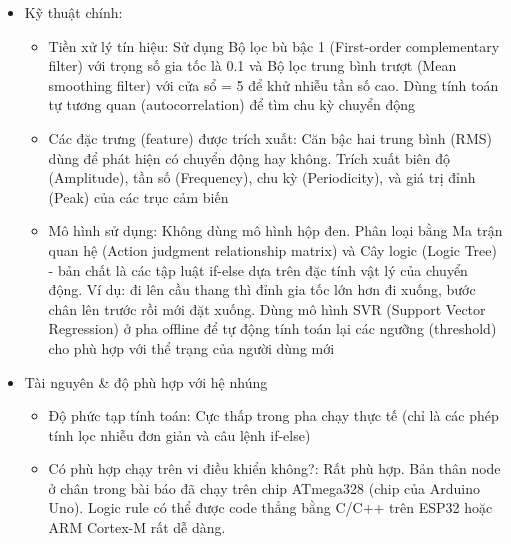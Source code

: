 \documentclass[../DoAn.tex]{subfiles}
\begin{document}
\begin{enumerate}[label=\arabic*)]
\begin{itemize}
        \begin{itemize}
            \item Thuộc loại: Hybrid (Threshold-based / Suy luận logic kết hợp với Machine Learning nhẹ để tinh chỉnh)
            \item Pipeline xử lý tổng quát: Thu thập dữ liệu đa nguồn $\Longrightarrow$ Tiền xử lý (Lọc nhiễu, tính RMS để phát hiện điểm bắt đầu) $\Longrightarrow$ Rút trích đặc trưng cơ bản $\Longrightarrow$ Phân loại bằng Cây logic (Logic Tree/Ontology reasoning) $\Longrightarrow$ Hiệu chỉnh ngưỡng thích ứng bằng hàm SVR (Cá nhân hóa)
        \end{itemize}
        \item Kỹ thuật chính:
        \begin{itemize}
            \item Tiền xử lý tín hiệu: Sử dụng Bộ lọc bù bậc 1 (First-order complementary filter) với trọng số gia tốc là 0.1 và Bộ lọc trung bình trượt (Mean smoothing filter) với cửa sổ = 5 để khử nhiễu tần số cao. Dùng tính toán tự tương quan (autocorrelation) để tìm chu kỳ chuyển động
            \item Các đặc trưng (feature) được trích xuất: Căn bậc hai trung bình (RMS) dùng để phát hiện có chuyển động hay không. Trích xuất biên độ (Amplitude), tần số (Frequency), chu kỳ (Periodicity), và giá trị đỉnh (Peak) của các trục cảm biến
            \item Mô hình sử dụng: Không dùng mô hình hộp đen. Phân loại bằng Ma trận quan hệ (Action judgment relationship matrix) và Cây logic (Logic Tree) - bản chất là các tập luật if-else dựa trên đặc tính vật lý của chuyển động. Ví dụ: đi lên cầu thang thì đỉnh gia tốc lớn hơn đi xuống, bước chân lên trước rồi mới đặt xuống. Dùng mô hình SVR (Support Vector Regression) ở pha offline để tự động tính toán lại các ngưỡng (threshold) cho phù hợp với thể trạng của người dùng mới
        \end{itemize}
        \item Tài nguyên & độ phù hợp với hệ nhúng
        \begin{itemize}
            \item Độ phức tạp tính toán: Cực thấp trong pha chạy thực tế (chỉ là các phép tính lọc nhiễu đơn giản và câu lệnh if-else)
            \item Có phù hợp chạy trên vi điều khiển không?: Rất phù hợp. Bản thân node ở chân trong bài báo đã chạy trên chip ATmega328 (chip của Arduino Uno). Logic rule có thể được code thẳng bằng C/C++ trên ESP32 hoặc ARM Cortex-M rất dễ dàng.

\end{itemize}
\end{itemize}
\end{enumerate}
\end{document}
